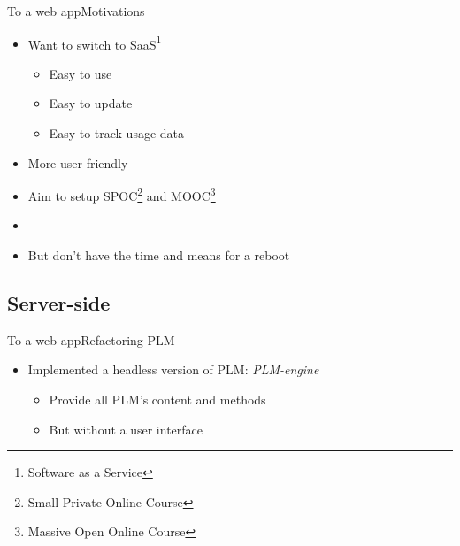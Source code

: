 \documentclass{beamer}
\begin{document}
\begin{frame}{To a web app}{Motivations}
  \begin{itemize}
  \item {
    Want to switch to SaaS\footnote{Software as a Service}
    \begin{itemize}
    \item Easy to use
    \item Easy to update
    \item Easy to track usage data
    \end{itemize}
  }
  \item {
    More user-friendly
  }
  \item {
    Aim to setup SPOC\footnote{Small Private Online Course} and MOOC\footnote{Massive Open Online Course}
  }
  \item[~]
  \item {
    But don't have the time and means for a reboot
  }
  \end{itemize}
\end{frame}

\subsection{Server-side}

\begin{frame}{To a web app}{Refactoring PLM}
  \begin{itemize}
  \item {
    Implemented a headless version of PLM: \emph{PLM-engine}
    \begin{itemize}
    \item Provide all PLM's content and methods
    \item But without a user interface
    \end{itemize}
  }
  \end{itemize}
  \begin{center}
  \end{center}
\end{frame}
\end{document}
